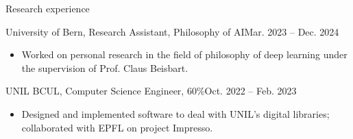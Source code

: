 \documentclass[]{mcdowellcv}
\begin{document}
   
    \begin{cvsection}{Research experience}
        \begin{cvsubsection}{University of Bern, Research Assistant, Philosophy of AI}{}{Mar. 2023 -- Dec. 2024}
                \begin{itemize}
                  \item Worked on personal research in the field of philosophy of deep learning under the supervision of Prof. Claus Beisbart.
                \end{itemize}
            \end{cvsubsection}
        \begin{cvsubsection}{UNIL BCUL, Computer Science Engineer, 60\%}{}{Oct. 2022 -- Feb. 2023}
            \begin{itemize}
              \item Designed and implemented software to deal with UNIL's digital libraries; collaborated with EPFL on project Impresso.
            \end{itemize}
        \end{cvsubsection}
 

\end{cvsection}
\end{document}
